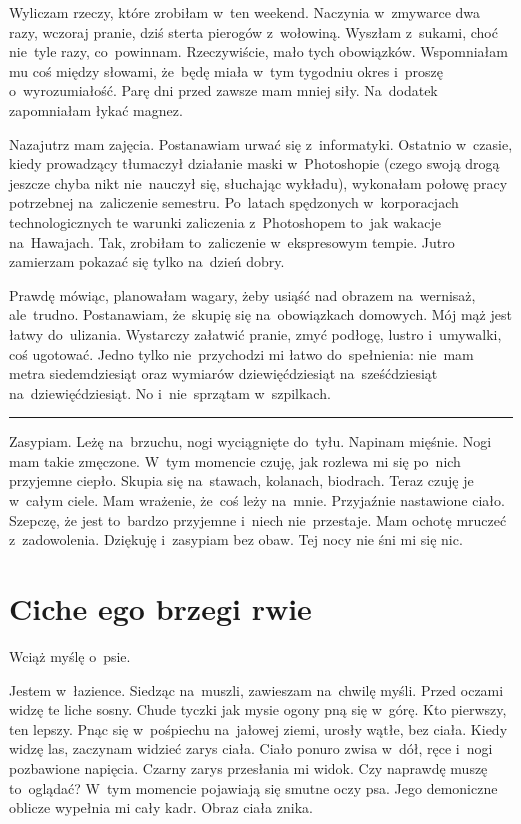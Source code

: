 \documentclass[9pt, a5paper]{memoir}
\begin{document}
Wyliczam rzeczy, które zrobiłam w~ten weekend. Naczynia w~zmywarce dwa razy, wczoraj pranie, dziś sterta pierogów z~wołowiną. Wyszłam z~sukami, choć nie~tyle razy, co~powinnam. Rzeczywiście, mało tych obowiązków. Wspomniałam mu coś między słowami, że~będę miała w~tym tygodniu okres i~proszę o~wyrozumiałość. Parę dni przed zawsze mam mniej siły. Na~dodatek zapomniałam łykać magnez.

Nazajutrz mam zajęcia. Postanawiam urwać się z~informatyki. Ostatnio w~czasie, kiedy prowadzący tłumaczył działanie maski w~Photoshopie (czego swoją drogą jeszcze chyba nikt nie~nauczył się, słuchając wykładu), wykonałam połowę pracy potrzebnej na~zaliczenie semestru. Po~latach spędzonych w~korporacjach technologicznych te warunki zaliczenia z~Photoshopem to~jak wakacje na~Hawajach. Tak, zrobiłam to~zaliczenie w~ekspresowym tempie. Jutro zamierzam pokazać się tylko na~dzień dobry.

Prawdę mówiąc, planowałam wagary, żeby usiąść nad obrazem na~wernisaż, ale~trudno. Postanawiam, że~skupię się na~obowiązkach domowych. Mój mąż jest łatwy do~ulizania. Wystarczy załatwić pranie, zmyć podłogę, lustro i~umywalki, coś ugotować. Jedno tylko nie~przychodzi mi łatwo do~spełnienia: nie~mam metra siedemdziesiąt oraz wymiarów dziewięćdziesiąt na~sześćdziesiąt na~dziewięćdziesiąt. No i~nie~sprzątam w~szpilkach.

\fancybreak{* \quad * \quad *}

Zasypiam. Leżę na~brzuchu, nogi wyciągnięte do~tyłu. Napinam mięśnie. Nogi mam takie zmęczone. W~tym momencie czuję, jak rozlewa mi się po~nich przyjemne ciepło. Skupia się na~stawach, kolanach, biodrach. Teraz czuję je w~całym ciele. Mam wrażenie, że~coś leży na~mnie. Przyjaźnie nastawione ciało. Szepczę, że jest to~bardzo przyjemne i~niech nie~przestaje. Mam ochotę mruczeć z~zadowolenia. Dziękuję i~zasypiam bez obaw. Tej nocy nie śni mi się nic.

\newpage
\section{Ciche ego brzegi rwie}
Wciąż myślę o~psie.

Jestem w~łazience. Siedząc na~muszli, zawieszam na~chwilę myśli. Przed oczami widzę te liche sosny. Chude tyczki jak mysie ogony pną się w~górę. Kto pierwszy, ten lepszy. Pnąc się w~pośpiechu na~jałowej ziemi, urosły wątłe, bez ciała. Kiedy widzę las, zaczynam widzieć zarys ciała. Ciało ponuro zwisa w~dół, ręce i~nogi pozbawione napięcia. Czarny zarys przesłania mi widok. Czy naprawdę muszę to~oglądać? W~tym momencie pojawiają się smutne oczy psa. Jego demoniczne oblicze wypełnia mi cały kadr. Obraz ciała znika.
\end{document}
